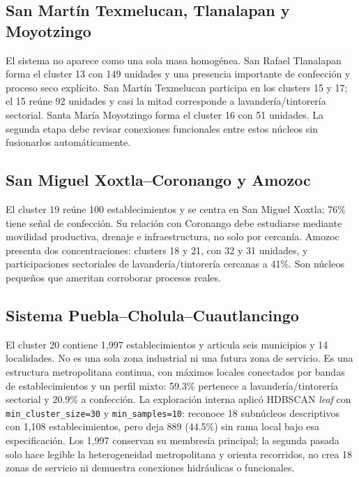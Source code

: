 \documentclass[11pt,letterpaper]{article}
\begin{document}
\subsection*{San Martín Texmelucan, Tlanalapan y Moyotzingo}

El sistema no aparece como una sola masa homogénea. San Rafael Tlanalapan forma el cluster 13 con 149 unidades y una presencia importante de confección y proceso seco explícito. San Martín Texmelucan participa en los clusters 15 y 17; el 15 reúne 92 unidades y casi la mitad corresponde a lavandería/tintorería sectorial. Santa María Moyotzingo forma el cluster 16 con 51 unidades. La segunda etapa debe revisar conexiones funcionales entre estos núcleos sin fusionarlos automáticamente.

\subsection*{San Miguel Xoxtla--Coronango y Amozoc}

El cluster 19 reúne 100 establecimientos y se centra en San Miguel Xoxtla; 76\% tiene señal de confección. Su relación con Coronango debe estudiarse mediante movilidad productiva, drenaje e infraestructura, no solo por cercanía. Amozoc presenta dos concentraciones: clusters 18 y 21, con 32 y 31 unidades, y participaciones sectoriales de lavandería/tintorería cercanas a 41\%. Son núcleos pequeños que ameritan corroborar procesos reales.

\subsection*{Sistema Puebla--Cholula--Cuautlancingo}

El cluster 20 contiene 1,997 establecimientos y articula seis municipios y 14 localidades. No es una sola zona industrial ni una futura zona de servicio. Es una estructura metropolitana continua, con máximos locales conectados por bandas de establecimientos y un perfil mixto: 59.3\% pertenece a lavandería/tintorería sectorial y 20.9\% a confección. La exploración interna aplicó HDBSCAN \emph{leaf} con \texttt{min\_cluster\_size=30} y \texttt{min\_samples=10}: reconoce 18 subnúcleos descriptivos con 1,108 establecimientos, pero deja 889 (44.5\%) sin rama local bajo esa especificación. Los 1,997 conservan su membresía principal; la segunda pasada solo hace legible la heterogeneidad metropolitana y orienta recorridos, no crea 18 zonas de servicio ni demuestra conexiones hidráulicas o funcionales.
\end{document}
